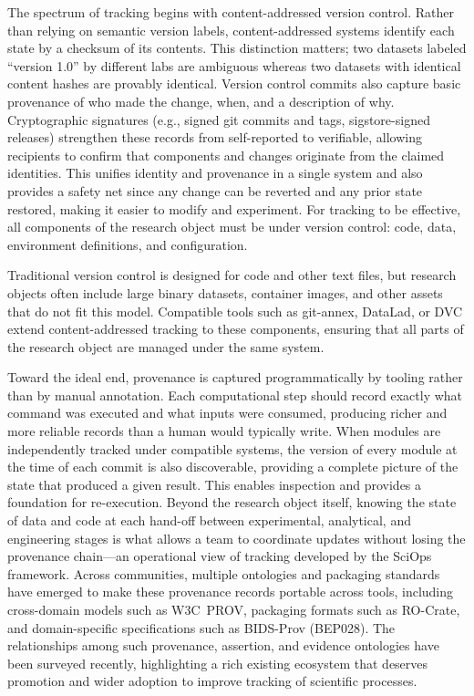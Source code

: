 \documentclass{article}
\begin{document}
The spectrum of tracking begins with content-addressed version control.
Rather than relying on semantic version labels, content-addressed systems identify each state by a checksum of its contents.
This distinction matters; two datasets labeled ``version 1.0'' by different labs are ambiguous whereas two datasets with identical content hashes are provably identical.
Version control commits also capture basic provenance of who made the change, when, and a description of why.
Cryptographic signatures (e.g., signed git commits and tags, sigstore-signed releases) strengthen these records from self-reported to verifiable, allowing recipients to confirm that components and changes originate from the claimed identities.
This unifies identity and provenance in a single system and also provides a safety net since any change can be reverted and any prior state restored, making it easier to modify and experiment.
For tracking to be effective, all components of the research object must be under version control: code, data, environment definitions, and configuration.

Traditional version control is designed for code and other text files, but research objects often include large binary datasets, container images, and other assets that do not fit this model.
Compatible tools such as git-annex, DataLad\cite{halchenko_datalad_2021}, or DVC\cite{ruslan_kuprieiev_dvc_2026} extend content-addressed tracking to these components, ensuring that all parts of the research object are managed under the same system.

Toward the ideal end, provenance is captured programmatically by tooling rather than by manual annotation.
Each computational step should record exactly what command was executed and what inputs were consumed, producing richer and more reliable records than a human would typically write.
When modules are independently tracked under compatible systems, the version of every module at the time of each commit is also discoverable, providing a complete picture of the state that produced a given result.
This enables inspection and provides a foundation for re-execution.
Beyond the research object itself, knowing the state of data and code at each hand-off between experimental, analytical, and engineering stages is what allows a team to coordinate updates without losing the provenance chain---an operational view of tracking developed by the SciOps framework\cite{johnson_sciops_2024}.
Across communities, multiple ontologies and packaging standards have emerged to make these provenance records portable across tools, including cross-domain models such as W3C~PROV\cite{w3c_provenance_working_group_prov-overview_2013}, packaging formats such as RO-Crate\cite{peroni_packaging_2022}, and domain-specific specifications such as BIDS-Prov (BEP028)\cite{bids_community_bep028_2025}.
The relationships among such provenance, assertion, and evidence ontologies have been surveyed recently\cite{chhetri_bridging_2025}, highlighting a rich existing ecosystem that deserves promotion and wider adoption to improve tracking of scientific processes.
\end{document}
